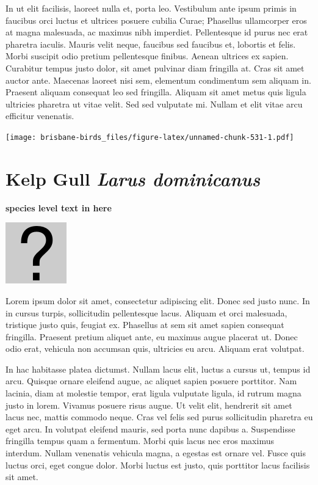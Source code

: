 \documentclass[]{book}
\let\origfigure\figure
\let\endorigfigure\endfigure
\renewenvironment{figure}[1][2] {
  \expandafter\origfigure\expandafter[H]
} {
  \endorigfigure
}
\begin{document}
In ut elit facilisis, laoreet nulla et, porta leo. Vestibulum ante ipsum
primis in faucibus orci luctus et ultrices posuere cubilia Curae;
Phasellus ullamcorper eros at magna malesuada, ac maximus nibh
imperdiet. Pellentesque id purus nec erat pharetra iaculis. Mauris velit
neque, faucibus sed faucibus et, lobortis et felis. Morbi suscipit odio
pretium pellentesque finibus. Aenean ultrices ex sapien. Curabitur
tempus justo dolor, sit amet pulvinar diam fringilla at. Cras sit amet
auctor ante. Maecenas laoreet nisi sem, elementum condimentum sem
aliquam in. Praesent aliquam consequat leo sed fringilla. Aliquam sit
amet metus quis ligula ultricies pharetra ut vitae velit. Sed sed
vulputate mi. Nullam et elit vitae arcu efficitur venenatis.

\begin{figure}
\centering
\texttt{[image: brisbane-birds\_files/figure-latex/unnamed-chunk-531-1.pdf]}
\caption{\label{fig:unnamed-chunk-531}insert figure caption}
\end{figure}

\section{\texorpdfstring{Kelp Gull \emph{Larus
dominicanus}}{Kelp Gull Larus dominicanus}}\label{kelp-gull-larus-dominicanus}

\textbf{species level text in here}

\begin{figure}
\centering
\includegraphics{assets/missing.png}
\caption{No image for species}
\end{figure}

Lorem ipsum dolor sit amet, consectetur adipiscing elit. Donec sed justo
nunc. In in cursus turpis, sollicitudin pellentesque lacus. Aliquam et
orci malesuada, tristique justo quis, feugiat ex. Phasellus at sem sit
amet sapien consequat fringilla. Praesent pretium aliquet ante, eu
maximus augue placerat ut. Donec odio erat, vehicula non accumsan quis,
ultricies eu arcu. Aliquam erat volutpat.

In hac habitasse platea dictumst. Nullam lacus elit, luctus a cursus ut,
tempus id arcu. Quisque ornare eleifend augue, ac aliquet sapien posuere
porttitor. Nam lacinia, diam at molestie tempor, erat ligula vulputate
ligula, id rutrum magna justo in lorem. Vivamus posuere risus augue. Ut
velit elit, hendrerit sit amet lacus nec, mattis commodo neque. Cras vel
felis sed purus sollicitudin pharetra eu eget arcu. In volutpat eleifend
mauris, sed porta nunc dapibus a. Suspendisse fringilla tempus quam a
fermentum. Morbi quis lacus nec eros maximus interdum. Nullam venenatis
vehicula magna, a egestas est ornare vel. Fusce quis luctus orci, eget
congue dolor. Morbi luctus est justo, quis porttitor lacus facilisis sit
amet.
\end{document}
